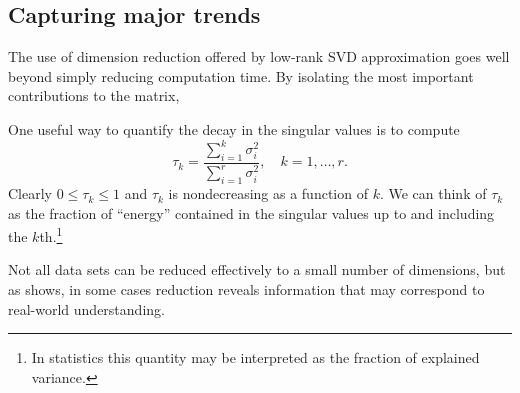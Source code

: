\begin{exam*}
\end{exam*}

\subsection{Capturing major trends}

The use of dimension reduction offered by low-rank SVD approximation goes well beyond simply reducing computation time. By isolating the most important contributions to the matrix, 

One useful way to quantify the decay in the singular values is to compute
\begin{equation}
  \label{eq:sing-val-decay}
  \tau_k = \frac{\sum_{i=1}^k \sigma_i^2}{\sum_{i=1}^r \sigma_i^2}, \quad k=1,\ldots,r.
\end{equation}
Clearly $0\le \tau_k \le 1$ and $\tau_k$ is nondecreasing as a function of $k$. We can think of $\tau_k$ as the fraction of ``energy'' contained in the singular values up to and including the $k$th.\footnote{In statistics this quantity may be interpreted as the fraction of explained variance.}

\begin{exam}
\end{exam}

Not all data sets can be reduced effectively to a small number of dimensions, but as  shows, in some cases reduction reveals information that may correspond to real-world understanding.

\begin{exercises}
	
\end{exercises}




